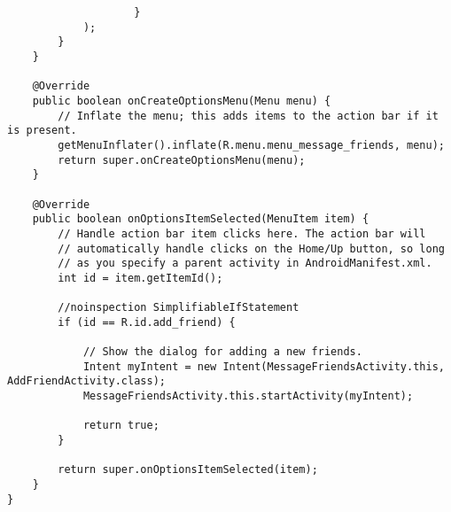 \begin{lstlisting}
                    }
            );
        }
    }

    @Override
    public boolean onCreateOptionsMenu(Menu menu) {
        // Inflate the menu; this adds items to the action bar if it is present.
        getMenuInflater().inflate(R.menu.menu_message_friends, menu);
        return super.onCreateOptionsMenu(menu);
    }

    @Override
    public boolean onOptionsItemSelected(MenuItem item) {
        // Handle action bar item clicks here. The action bar will
        // automatically handle clicks on the Home/Up button, so long
        // as you specify a parent activity in AndroidManifest.xml.
        int id = item.getItemId();

        //noinspection SimplifiableIfStatement
        if (id == R.id.add_friend) {

            // Show the dialog for adding a new friends.
            Intent myIntent = new Intent(MessageFriendsActivity.this, AddFriendActivity.class);
            MessageFriendsActivity.this.startActivity(myIntent);

            return true;
        }

        return super.onOptionsItemSelected(item);
    }
}
\end{lstlisting}

